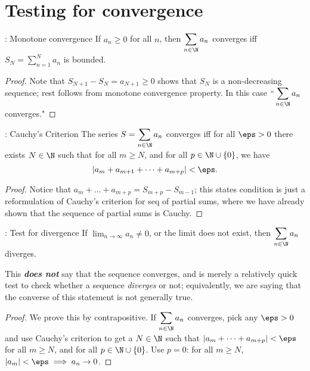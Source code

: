 \clearpage
\section{Testing for convergence}
\begin{ntheorem}{: Monotone convergence}
	If \(a_n\geq 0\) for all \(n\), then \(\displaystyle\sum_{n\in\N}a_n\) converges iff \(S_N=\displaystyle\sum_{n=1}^N a_n\) is bounded.
\end{ntheorem}
\begin{proof}
	Note that \(S_{N+1}-S_N=a_{N+1}\geq 0\) shows that \(S_N\) is a non-decreasing sequence; rest follows from monotone convergence property. In this case \(``\displaystyle\sum_{n\in\N}a_n\) converges."
\end{proof}
\begin{ntheorem}{: Cauchy's Criterion}
	The series \(S=\displaystyle\sum_{n\in\N}a_n\) converges iff for all \(\eps>0\) there exists \(N\in\N\) such that for all \(m\geq N\), and for all \(p\in\N\cup\{0\}\), we have
	\begin{equation*}
		|a_m+a_{m+1}+\dots+a_{m+p}|<\eps.
	\end{equation*}
\end{ntheorem}
\begin{proof}
	Notice that \(a_m+\dots+a_{m+p}=S_{m+p}-S_{m-1}\); this states condition is just a reformulation of Cauchy's criterion for seq of partial sums, where we have already shown that the sequence of partial sums is Cauchy.
\end{proof}
\begin{ntheorem}{: Test for divergence}
	If \(\displaystyle\lim_{n\to\infty}a_n\neq 0\), or the limit does not exist, then \(\displaystyle\sum_{n\in\N}a_n\) diverges.
\end{ntheorem}
\begin{note}
	This \emph{\textbf{does not}} say that the sequence converges, and is merely a relatively quick test to check whether a sequence \emph{diverges} or not; equivalently, we are saying that the converse of this statement is not generally true.
\end{note}
\begin{proof}
	We prove this by contrapositive. If \(\displaystyle\sum_{n\in\N}a_n\) converges, pick any \(\eps>0\) and use Cauchy's criterion to get a \(N\in\N\) such that \(|a_m+\dots+a_{m+p}|<\eps\) for all \(m\geq N\), and for all \(p\in\N\cup\{0\}\). Use \(p=0\): for all \(m\geq N\), \(|a_m|<\eps\implies a_n\to 0\).
\end{proof}

